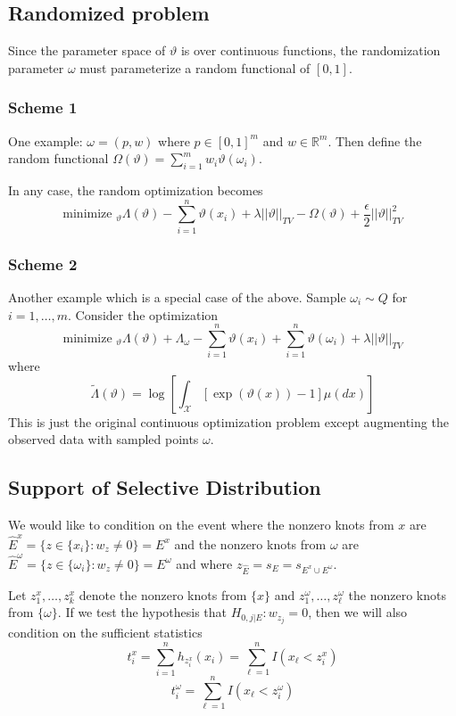 \documentclass[11pt]{article}
\begin{document}
\subsection{Randomized problem}

Since the parameter space of $\vartheta$ is over continuous functions,
the randomization parameter $\omega$ must parameterize a random functional of $[0, 1]$.

\subsubsection{Scheme 1}
One example: $\omega = (p, w)$ where $p \in [0,1]^m$ and $w \in
  \mathbb{R}^m$.  Then define the random functional $\Omega(\vartheta)
  = \sum_{i=1}^m w_i \vartheta(\omega_i)$.

In any case, the random optimization becomes
\[
\text{minimize }_\vartheta \Lambda(\vartheta) - \sum_{i=1}^n
\vartheta(x_i) + \lambda ||\vartheta||_{TV} - \Omega(\vartheta) +
\frac{\epsilon}{2}||\vartheta||_{TV}^2
\]

\subsubsection{Scheme 2}
Another example which is a special case of the above.
Sample $\omega_i \sim Q$ for $i = 1,\hdots, m$.
Consider the optimization
\[
\text{minimize }_\vartheta \Lambda(\vartheta) +\Lambda_\omega -
\sum_{i=1}^{n} \vartheta(x_i) + \sum_{i=1}^n \vartheta(\omega_i) + \lambda ||\vartheta||_{TV}
\]
where
\[\tilde{\Lambda}(\vartheta) = \log\left[\int_\mathcal{X} \left[ \exp(\vartheta(x)) - 1\right] \mu(dx)\right]\]
This is just the original continuous optimization problem except
augmenting the observed data with sampled points $\omega$.

\subsection{Support of Selective Distribution}

We would like to condition on the event where the nonzero knots from
$x$ are $\hat{E}^x = \{z \in \{x_i\}: w_z \neq 0\} = E^x$ and the
nonzero knots from $\omega$ are $\hat{E}^\omega = \{z \in \{\omega_i\}
: w_z \neq 0\} = E^\omega$ and where $z_{\hat{E}} = s_E = s_{E^x \cup
  E^\omega}$.

Let $z_1^x,\hdots, z_k^x$ denote the nonzero knots from $\{x\}$ and
$z_1^\omega,\hdots, z_\ell^\omega$ the nonzero knots from $\{\omega\}$.  If we test
the hypothesis that $H_{0, j|E}: w_{z_j} = 0$, then we will also
condition on the sufficient statistics
\[
t_i^x = \sum_{i=1}^n h_{z_i^x}(x_i)  = \sum_{\ell=1}^n I(x_\ell < z_i^x)
\]
\[
t_i^\omega = \sum_{\ell=1}^n I(x_\ell < z_i^\omega)
\]
\end{document}

